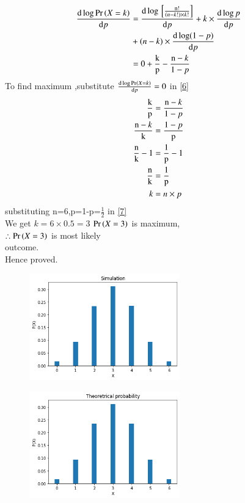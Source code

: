 \documentclass[journal,12pt,twocolumn]{IEEEtran}
\begin{document}
\begin{align}
\frac{\mathrm{d} \log \Pr\left(X=k\right) }{\mathrm{d} p}&=\frac{\mathrm{d} \log {}\left[\frac{\text n!}{\text (n-k!)\times k!}\right]}{\mathrm{d}p}+k\times  \frac{\mathrm{d}\log p}{\mathrm{d} p} \\
     &+(n-k) \times \frac{\mathrm{d}\log (1-p)}{\mathrm{d} p} \notag \\
     &=0+\frac{\text k}{\text p}-\frac{\text n-k}{\text 1-p} \label{6}
\end{align}
To find maximum ,substitute $\frac{\mathrm{d} \log  \Pr\left(X=k\right) }{\mathrm{d} p}=0$ in \eqref{6}
\begin{align}
\frac{\text k}{\text p}&=\frac{\text n-k}{\text 1-p}  \\
\frac{\text n-k}{\text k}&=\frac{\text 1-p}{\text p}  \\
\frac{\text n}{\text k}-1&=\frac{\text 1}{\text p}-1  \\
\frac{\text n}{\text k}&=\frac{\text 1}{\text p}  \\
k&=n\times p \label{7}
\end{align}
substituting n=6,p=1-p=$\frac{1}{2}$ in \eqref{7}\\
We get $k=6\times 0.5=3$
$\Pr\left(X=3\right)$ is maximum,\\
$\therefore\Pr\left(X=3\right)$ is most likely \\
outcome.\\
Hence proved.

\begin{figure}
\begin{center}
\includegraphics[width=0.58\textwidth]{assignment1.png}
\end{center}
\end{figure}
\begin{figure}
\begin{center}
\includegraphics[width=0.58\textwidth]{assignment-1.png}
\end{center}
\end{figure}
\end{document}
